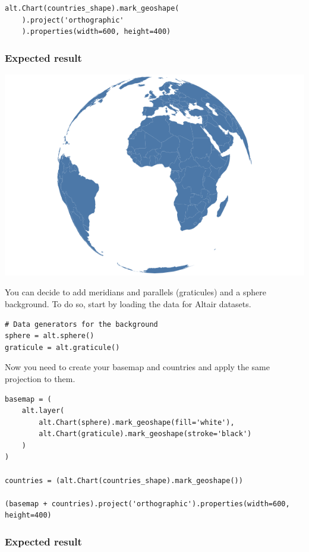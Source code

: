 \documentclass[11pt]{article}
\begin{document}
\begin{verbatim}
alt.Chart(countries_shape).mark_geoshape(
    ).project('orthographic'
    ).properties(width=600, height=400)
\end{verbatim}

\subsubsection*{Expected result}

\begin{center}
\includegraphics[width=.6\textwidth]{visualization (1).png}
\end{center}

You can decide to add meridians and parallels (graticules) and a sphere background. To do so, start by loading the data for Altair datasets.

\begin{verbatim}
# Data generators for the background
sphere = alt.sphere()
graticule = alt.graticule()
\end{verbatim}

Now you need to create your basemap and countries and apply the same projection to them.

\begin{verbatim}
basemap = (
    alt.layer(
        alt.Chart(sphere).mark_geoshape(fill='white'),
        alt.Chart(graticule).mark_geoshape(stroke='black')
    )
)

countries = (alt.Chart(countries_shape).mark_geoshape())

(basemap + countries).project('orthographic').properties(width=600, height=400)
\end{verbatim}

\subsubsection*{Expected result}
\end{document}
